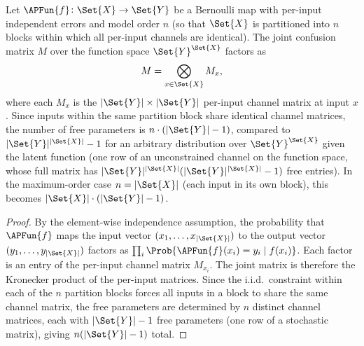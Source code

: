 \documentclass[ ../main.tex]{subfiles}
\begin{document}
\begin{theorem}
\label{thm:kronecker}
Let $\APFun{f} \colon \Set{X} \to \Set{Y}$ be a Bernoulli map with per-input independent errors and model order $n$ (so that $\Set{X}$ is partitioned into $n$ blocks within which all per-input channels are identical).
The joint confusion matrix $M$ over the function space $\Set{Y}^{\Set{X}}$ factors as
\begin{equation}
M = \bigotimes_{x \in \Set{X}} M_x,
\end{equation}
where each $M_x$ is the $|\Set{Y}| \times |\Set{Y}|$ per-input channel matrix at input $x$.
Since inputs within the same partition block share identical channel matrices, the number of free parameters is $n \cdot (|\Set{Y}| - 1)$, compared to $|\Set{Y}|^{|\Set{X}|} - 1$ for an arbitrary distribution over $\Set{Y}^{\Set{X}}$ given the latent function (one row of an unconstrained channel on the function space, whose full matrix has $|\Set{Y}|^{|\Set{X}|}(|\Set{Y}|^{|\Set{X}|} - 1)$ free entries).
In the maximum-order case $n = |\Set{X}|$ (each input in its own block), this becomes $|\Set{X}| \cdot (|\Set{Y}| - 1)$.
\end{theorem}
\begin{proof}
By the element-wise independence assumption, the probability that $\APFun{f}$ maps the input vector $(x_1, \ldots, x_{|\Set{X}|})$ to the output vector $(y_1, \ldots, y_{|\Set{X}|})$ factors as
$\prod_{i} \Prob{\APFun{f}(x_i) = y_i \mid f(x_i)}$.
Each factor is an entry of the per-input channel matrix $M_{x_i}$.
The joint matrix is therefore the Kronecker product of the per-input matrices.
Since the i.i.d.\ constraint within each of the $n$ partition blocks forces all inputs in a block to share the same channel matrix, the free parameters are determined by $n$ distinct channel matrices, each with $|\Set{Y}| - 1$ free parameters (one row of a stochastic matrix), giving $n(|\Set{Y}| - 1)$ total.
\end{proof}
\end{document}

